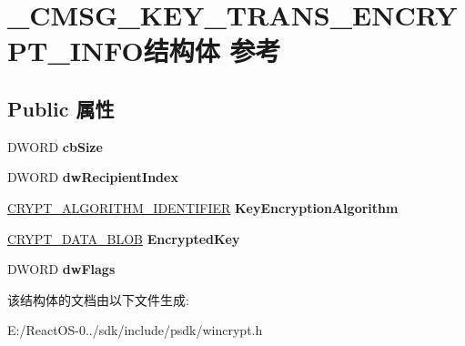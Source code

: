 \hypertarget{struct___c_m_s_g___k_e_y___t_r_a_n_s___e_n_c_r_y_p_t___i_n_f_o}{}\section{\+\_\+\+C\+M\+S\+G\+\_\+\+K\+E\+Y\+\_\+\+T\+R\+A\+N\+S\+\_\+\+E\+N\+C\+R\+Y\+P\+T\+\_\+\+I\+N\+F\+O结构体 参考}
\label{struct___c_m_s_g___k_e_y___t_r_a_n_s___e_n_c_r_y_p_t___i_n_f_o}
\subsection*{Public 属性}
\begin{DoxyCompactItemize}
\item 
\mbox{\label{struct___c_m_s_g___k_e_y___t_r_a_n_s___e_n_c_r_y_p_t___i_n_f_o_a22f69b5c85d770c2fd02fa6b755f8826}} 
D\+W\+O\+RD {\bfseries cb\+Size}
\item 
\mbox{\label{struct___c_m_s_g___k_e_y___t_r_a_n_s___e_n_c_r_y_p_t___i_n_f_o_a1a507b0a24b4bfa73d0214ba8387d19d}} 
D\+W\+O\+RD {\bfseries dw\+Recipient\+Index}
\item 
\mbox{\label{struct___c_m_s_g___k_e_y___t_r_a_n_s___e_n_c_r_y_p_t___i_n_f_o_ab36bc7605d7c0dd79a61e2edacd89be6}} 
\hyperlink{struct___c_r_y_p_t___a_l_g_o_r_i_t_h_m___i_d_e_n_t_i_f_i_e_r}{C\+R\+Y\+P\+T\+\_\+\+A\+L\+G\+O\+R\+I\+T\+H\+M\+\_\+\+I\+D\+E\+N\+T\+I\+F\+I\+ER} {\bfseries Key\+Encryption\+Algorithm}
\item 
\mbox{\label{struct___c_m_s_g___k_e_y___t_r_a_n_s___e_n_c_r_y_p_t___i_n_f_o_a2aac7a88e0ca942bb64e9054fb9475c1}} 
\hyperlink{struct___c_r_y_p_t_o_a_p_i___b_l_o_b}{C\+R\+Y\+P\+T\+\_\+\+D\+A\+T\+A\+\_\+\+B\+L\+OB} {\bfseries Encrypted\+Key}
\item 
\mbox{\label{struct___c_m_s_g___k_e_y___t_r_a_n_s___e_n_c_r_y_p_t___i_n_f_o_ab17d6bc4e57a8ec111cc4bb04f5c6595}} 
D\+W\+O\+RD {\bfseries dw\+Flags}
\end{DoxyCompactItemize}


该结构体的文档由以下文件生成\+:\begin{DoxyCompactItemize}
\item 
E\+:/\+React\+O\+S-\/0../sdk/include/psdk/wincrypt.\+h\end{DoxyCompactItemize}
